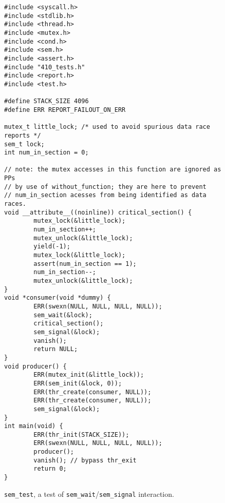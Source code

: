 \documentclass[pldi]{../sigplanconf-pldi15}
\begin{document}
\begin{figure*}
\begin{verbatim}
#include <syscall.h>
#include <stdlib.h>
#include <thread.h>
#include <mutex.h>
#include <cond.h>
#include <sem.h>
#include <assert.h>
#include "410_tests.h"
#include <report.h>
#include <test.h>

#define STACK_SIZE 4096
#define ERR REPORT_FAILOUT_ON_ERR

mutex_t little_lock; /* used to avoid spurious data race reports */
sem_t lock;
int num_in_section = 0;

// note: the mutex accesses in this function are ignored as PPs
// by use of without_function; they are here to prevent
// num_in_section acesses from being identified as data races.
void __attribute__((noinline)) critical_section() {
        mutex_lock(&little_lock);
        num_in_section++;
        mutex_unlock(&little_lock);
        yield(-1);
        mutex_lock(&little_lock);
        assert(num_in_section == 1);
        num_in_section--;
        mutex_unlock(&little_lock);
}
void *consumer(void *dummy) {
        ERR(swexn(NULL, NULL, NULL, NULL));
        sem_wait(&lock);
        critical_section();
        sem_signal(&lock);
        vanish();
        return NULL;
}
void producer() {
        ERR(mutex_init(&little_lock));
        ERR(sem_init(&lock, 0));
        ERR(thr_create(consumer, NULL));
        ERR(thr_create(consumer, NULL));
        sem_signal(&lock);
}
int main(void) {
        ERR(thr_init(STACK_SIZE));
        ERR(swexn(NULL, NULL, NULL, NULL));
        producer();
        vanish(); // bypass thr_exit
        return 0;
}
\end{verbatim}
	\caption{{\tt sem\_test},
	a test of {\tt sem\_wait}/{\tt sem\_signal} interaction.}
	\label{fig:paradise}
\end{figure*}
\end{document}
